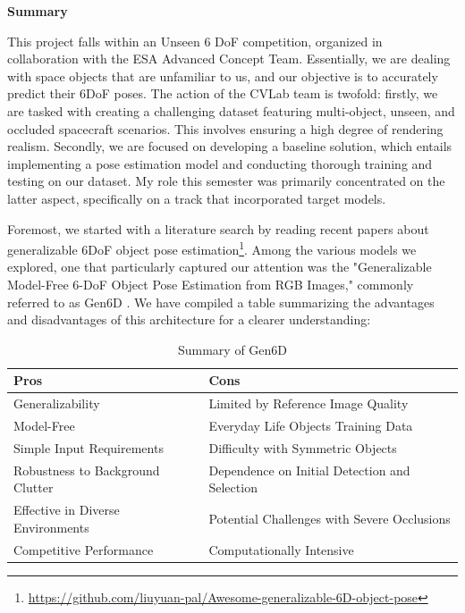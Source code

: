 

\begin{center}
    {\textbf{\large Summary} }
\end{center}

This project falls within an Unseen 6 \ac{DoF} competition, organized in collaboration with the \ac{ESA} Advanced Concept Team. Essentially, we are dealing with space objects that are unfamiliar to us, and our objective is to accurately predict their 6\ac{DoF} poses. The action of the \ac{CVLab} team is twofold: firstly, we are tasked with creating a challenging dataset featuring multi-object, unseen, and occluded spacecraft scenarios. This involves ensuring a high degree of rendering realism. Secondly, we are focused on developing a baseline solution, which entails implementing a pose estimation model and conducting thorough training and testing on our dataset. My role this semester was primarily concentrated on the latter aspect, specifically on a track that incorporated target models.

\bigbreak 

Foremost, we started with a literature search by reading recent papers about generalizable 6DoF object pose estimation\footnote{\url{https://github.com/liuyuan-pal/Awesome-generalizable-6D-object-pose}}. Among the various models we explored, one that particularly captured our attention was the "Generalizable Model-Free 6-DoF Object Pose Estimation from RGB Images," commonly referred to as Gen6D \cite{liu2023gen6d}. We have compiled a table summarizing the advantages and disadvantages of this architecture for a clearer understanding:

\begin{table}[htpb]
  \caption[Example table]{Summary of Gen6D}\label{tab:sample}
  \centering
  \small
  \begin{tabular}{l | l}
    \toprule
      Pros & Cons \\
    \midrule
      Generalizability & Limited by Reference Image Quality \\
      Model-Free & Everyday Life Objects Training Data \\
      Simple Input Requirements & Difficulty with Symmetric Objects \\
      Robustness to Background Clutter & Dependence on Initial Detection and Selection \\
      Effective in Diverse Environments & Potential Challenges with Severe Occlusions \\
      Competitive Performance & Computationally Intensive \\
    \bottomrule
  \end{tabular}
\end{table}

